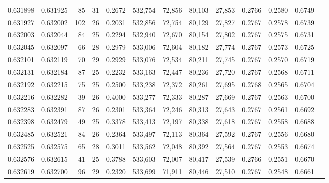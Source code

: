 \begin{tabular}{rrrrrrrrrrrrr}
0.631898 & 0.631925 &  85 &  31 &                                     0.2672 & 532,754 &  72,856 &  80,103 &  27,853 & 0.2766 & 0.2580 & 0.6749 \\
0.631927 & 0.632002 & 102 &  26 &                                     0.2031 & 532,856 &  72,754 &  80,129 &  27,827 & 0.2767 & 0.2578 & 0.6739 \\
0.632003 & 0.632044 &  84 &  25 &                                     0.2294 & 532,940 &  72,670 &  80,154 &  27,802 & 0.2767 & 0.2575 & 0.6731 \\
0.632045 & 0.632097 &  66 &  28 &                                     0.2979 & 533,006 &  72,604 &  80,182 &  27,774 & 0.2767 & 0.2573 & 0.6725 \\
0.632101 & 0.632119 &  70 &  29 &                                     0.2929 & 533,076 &  72,534 &  80,211 &  27,745 & 0.2767 & 0.2570 & 0.6719 \\
0.632131 & 0.632184 &  87 &  25 &                                     0.2232 & 533,163 &  72,447 &  80,236 &  27,720 & 0.2767 & 0.2568 & 0.6711 \\
0.632192 & 0.632215 &  75 &  25 &                                     0.2500 & 533,238 &  72,372 &  80,261 &  27,695 & 0.2768 & 0.2565 & 0.6704 \\
0.632216 & 0.632282 &  39 &  26 &                                     0.4000 & 533,277 &  72,333 &  80,287 &  27,669 & 0.2767 & 0.2563 & 0.6700 \\
0.632283 & 0.632391 &  87 &  26 &                                     0.2301 & 533,364 &  72,246 &  80,313 &  27,643 & 0.2767 & 0.2561 & 0.6692 \\
0.632398 & 0.632479 &  49 &  25 &                                     0.3378 & 533,413 &  72,197 &  80,338 &  27,618 & 0.2767 & 0.2558 & 0.6688 \\
0.632485 & 0.632521 &  84 &  26 &                                     0.2364 & 533,497 &  72,113 &  80,364 &  27,592 & 0.2767 & 0.2556 & 0.6680 \\
0.632525 & 0.632575 &  65 &  28 &                                     0.3011 & 533,562 &  72,048 &  80,392 &  27,564 & 0.2767 & 0.2553 & 0.6674 \\
0.632576 & 0.632615 &  41 &  25 &                                     0.3788 & 533,603 &  72,007 &  80,417 &  27,539 & 0.2766 & 0.2551 & 0.6670 \\
0.632619 & 0.632700 &  96 &  29 &                                     0.2320 & 533,699 &  71,911 &  80,446 &  27,510 & 0.2767 & 0.2548 & 0.6661 \\

\end{tabular}
